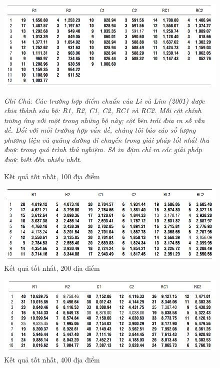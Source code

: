 \begin{center}
    \begin{figure}[htp]
    \caption{Kết quả tốt nhất, 100 địa điểm}        
    \begin{center}
     \includegraphics[scale=.5]{figures/Thuy_table11}
    \end{center}
  \textit{Ghi Chú: Các trường hợp điểm chuẩn của Li và Lim (2001) được chia thành sáu bộ: R1, R2, C1, C2, RC1 và RC2. Mỗi cột chính tương ứng với một trong những bộ này; cột bên trái đưa ra số vấn đề. Đối với mỗi trường hợp vấn đề, chúng tôi báo cáo số lượng phương tiện và quãng đường di chuyển trong giải pháp tốt nhất thu được trong quá trình thử nghiệm. Số in đậm chỉ ra các giải pháp được biết đến nhiều nhất.}
    \end{figure}
\end{center}


\begin{center}
    \begin{figure}[htp]
    \caption{Kết quả tốt nhất, 200 địa điểm}        
    \begin{center}
     \includegraphics[scale=.5]{figures/Thuy_table12}
    \end{center} 
    \end{figure}
\end{center}

\begin{center}
    \begin{figure}[htp]
    \caption{Kết quả tốt nhất, 400 địa điểm}        
    \begin{center}
     \includegraphics[scale=.5]{figures/Thuy_table13}
    \end{center}
    \end{figure}
\end{center}

